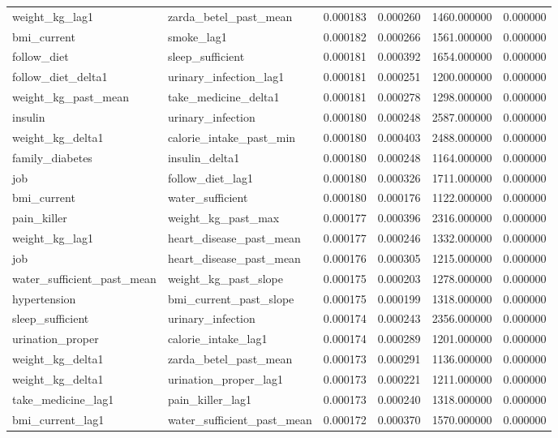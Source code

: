 \begin{longtable}{llrrrr}
weight\_kg\_lag1 & zarda\_betel\_past\_mean & 0.000183 & 0.000260 & 1460.000000 & 0.000000 \\
bmi\_current & smoke\_lag1 & 0.000182 & 0.000266 & 1561.000000 & 0.000000 \\
follow\_diet & sleep\_sufficient & 0.000181 & 0.000392 & 1654.000000 & 0.000000 \\
follow\_diet\_delta1 & urinary\_infection\_lag1 & 0.000181 & 0.000251 & 1200.000000 & 0.000000 \\
weight\_kg\_past\_mean & take\_medicine\_delta1 & 0.000181 & 0.000278 & 1298.000000 & 0.000000 \\
insulin & urinary\_infection & 0.000180 & 0.000248 & 2587.000000 & 0.000000 \\
weight\_kg\_delta1 & calorie\_intake\_past\_min & 0.000180 & 0.000403 & 2488.000000 & 0.000000 \\
family\_diabetes & insulin\_delta1 & 0.000180 & 0.000248 & 1164.000000 & 0.000000 \\
job & follow\_diet\_lag1 & 0.000180 & 0.000326 & 1711.000000 & 0.000000 \\
bmi\_current & water\_sufficient & 0.000180 & 0.000176 & 1122.000000 & 0.000000 \\
pain\_killer & weight\_kg\_past\_max & 0.000177 & 0.000396 & 2316.000000 & 0.000000 \\
weight\_kg\_lag1 & heart\_disease\_past\_mean & 0.000177 & 0.000246 & 1332.000000 & 0.000000 \\
job & heart\_disease\_past\_mean & 0.000176 & 0.000305 & 1215.000000 & 0.000000 \\
water\_sufficient\_past\_mean & weight\_kg\_past\_slope & 0.000175 & 0.000203 & 1278.000000 & 0.000000 \\
hypertension & bmi\_current\_past\_slope & 0.000175 & 0.000199 & 1318.000000 & 0.000000 \\
sleep\_sufficient & urinary\_infection & 0.000174 & 0.000243 & 2356.000000 & 0.000000 \\
urination\_proper & calorie\_intake\_lag1 & 0.000174 & 0.000289 & 1201.000000 & 0.000000 \\
weight\_kg\_delta1 & zarda\_betel\_past\_mean & 0.000173 & 0.000291 & 1136.000000 & 0.000000 \\
weight\_kg\_delta1 & urination\_proper\_lag1 & 0.000173 & 0.000221 & 1211.000000 & 0.000000 \\
take\_medicine\_lag1 & pain\_killer\_lag1 & 0.000173 & 0.000240 & 1318.000000 & 0.000000 \\
bmi\_current\_lag1 & water\_sufficient\_past\_mean & 0.000172 & 0.000370 & 1570.000000 & 0.000000 \\

\end{longtable}
